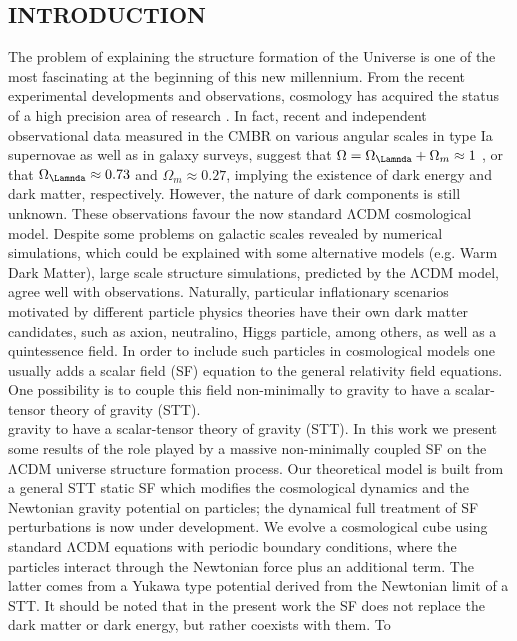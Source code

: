 \documentclass[10pt,twocolumn]{article}
\begin{document}
\begin{center}
\section{INTRODUCTION} 
\end{center}
The problem of explaining the structure formation of
the Universe is one of the most fascinating at the beginning of this new millennium. From the recent experimental developments and observations, cosmology has
acquired the status of a high precision area of research \cite{breton2004early}.  In fact, recent and independent observational data
measured in the CMBR on various angular scales in
type Ia supernovae \cite{breton2004early} as well as in galaxy surveys, suggest that 
$\nonumber
\Omega = \Omega_{\Lamnda} + \Omega_{m} \approx 1
$
, or that $\Omega_{\Lamnda} \approx0.73$ and $\Omega_{m}\approx0.27$, implying the existence of dark energy and
dark matter, respectively. However, the nature of dark
components is still unknown. These observations favour
the now standard ΛCDM cosmological model. Despite
some problems on galactic scales revealed by numerical
simulations, which could be explained with some alternative models (e.g. Warm Dark Matter), large scale structure simulations, predicted by the ΛCDM model, agree
well with observations. Naturally, particular inflationary
scenarios motivated by different particle physics theories
have their own dark matter candidates, such as axion,
neutralino, Higgs particle, among others, as well as a
quintessence field.  In order to include such particles in cosmological models one usually adds a scalar field
(SF) equation to the general relativity field equations.
One possibility is to couple this field non-minimally to
gravity to have a scalar-tensor theory of gravity (STT).
\\
gravity to have a scalar-tensor theory of gravity (STT).
In this work we present some results of the role played
by a massive non-minimally coupled SF on the ΛCDM
universe structure formation process. Our theoretical
model is built from a general STT static SF which modifies the cosmological dynamics and the Newtonian gravity potential on particles; the dynamical full treatment of
SF perturbations is now under development. We evolve a
cosmological cube using standard ΛCDM equations with
periodic boundary conditions, where the particles interact through the Newtonian force plus an additional term.
The latter comes from a Yukawa type potential derived
from the Newtonian limit of a STT. It should be noted
that in the present work the SF does not replace the dark matter or dark energy, but rather coexists with them. To
\end{document}
